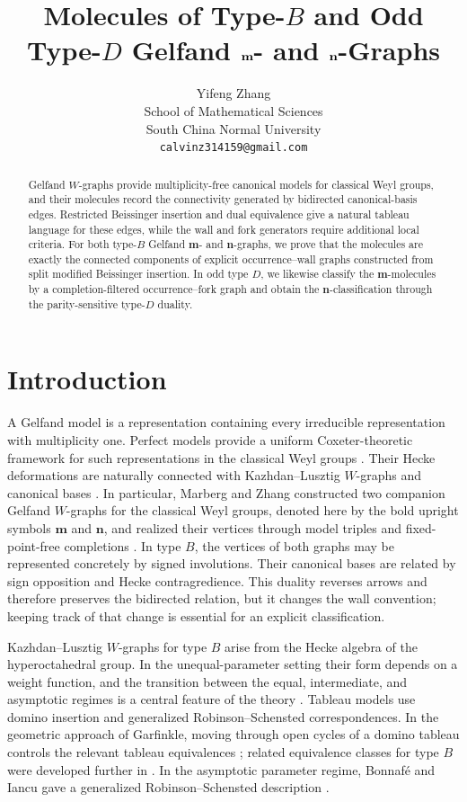 \documentclass[11pt]{article}
\title{Molecules of Type-$B$ and Odd Type-$D$ Gelfand
$\mgraph$- and $\ngraph$-Graphs}
\author{Yifeng Zhang
\\
School of Mathematical Sciences \\
South China Normal University \\
{\tt calvinz314159@gmail.com}}
\date{}
\theoremstyle{definition}
\theoremstyle{remark}
\newcommand{\mgraph}{\mathbf m}
\newcommand{\ngraph}{\mathbf n}
\begin{document}
\maketitle

\begin{abstract}
Gelfand $W$-graphs provide multiplicity-free canonical models for classical
Weyl groups, and their molecules record the connectivity generated by
bidirected canonical-basis edges.  Restricted Beissinger insertion and dual
equivalence give a natural tableau language for these edges, while the wall
and fork generators require additional local criteria.  For both type-$B$
Gelfand $\mgraph$- and $\ngraph$-graphs, we prove that the molecules are exactly
the connected components of explicit occurrence--wall graphs constructed
from split modified Beissinger insertion.  In odd type $D$, we likewise
classify the $\mgraph$-molecules by a completion-filtered occurrence--fork
graph and obtain the $\ngraph$-classification through the parity-sensitive
type-$D$ duality.
\end{abstract}

\section{Introduction}

A Gelfand model is a representation containing every irreducible
representation with multiplicity one.  Perfect models provide a uniform
Coxeter-theoretic framework for such representations in the classical
Weyl groups \cite{MZPerfect}.  Their Hecke deformations are naturally
connected with Kazhdan--Lusztig $W$-graphs and canonical bases
\cite{KazhdanLusztig,MarbergBar}.  In particular, Marberg and Zhang
constructed two companion Gelfand $W$-graphs for the classical Weyl
groups, denoted here by the bold upright symbols $\mgraph$ and $\ngraph$,
and realized their vertices through model triples and fixed-point-free
completions \cite{MZGelfand}.  In type $B$, the vertices of both graphs
may be represented concretely by signed involutions.  Their canonical
bases are related by sign opposition and Hecke contragredience.  This
duality reverses arrows and therefore preserves the bidirected relation,
but it changes the wall convention; keeping track of that change is
essential for an explicit classification.

Kazhdan--Lusztig $W$-graphs for type $B$ arise from the Hecke algebra of
the hyperoctahedral group.  In the unequal-parameter setting their form
depends on a weight function, and the transition between the equal,
intermediate, and asymptotic regimes is a central feature of the theory
\cite{LusztigUnequal,BonnafeIancu}.  Tableau models use domino insertion
and generalized Robinson--Schensted correspondences.  In the geometric
approach of Garfinkle, moving through open cycles of a domino tableau
controls the relevant tableau equivalences \cite{Garfinkle}; related
equivalence classes for type $B$ were developed further in
\cite{Pietraho}.  In the asymptotic parameter regime, Bonnaf\'e and Iancu
gave a generalized Robinson--Schensted description
\cite{BonnafeIancu}.
\end{document}
